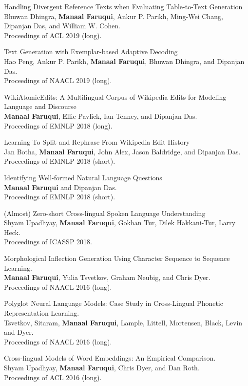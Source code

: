 \documentclass[margin,line]{res}
\begin{document}
\begin{resume}
Handling Divergent Reference Texts when Evaluating Table-to-Text Generation\\
Bhuwan Dhingra, \textbf{Manaal Faruqui}, Ankur P. Parikh, Ming-Wei Chang, Dipanjan Das, and William W. Cohen.\\
Proceedings of ACL 2019 (long).

Text Generation with Exemplar-based Adaptive Decoding\\
Hao Peng, Ankur P. Parikh, \textbf{Manaal Faruqui}, Bhuwan Dhingra, and Dipanjan Das.\\
Proceedings of NAACL 2019 (long).

WikiAtomicEdits: A Multilingual Corpus of Wikipedia Edits for Modeling Language and Discourse\\
\textbf{Manaal Faruqui}, Ellie Pavlick, Ian Tenney, and Dipanjan Das.\\
Proceedings of EMNLP 2018 (long).

Learning To Split and Rephrase From Wikipedia Edit History\\
Jan Botha, \textbf{Manaal Faruqui}, John Alex, Jason Baldridge, and Dipanjan Das.\\
Proceedings of EMNLP 2018 (short).

Identifying Well-formed Natural Language Questions\\
\textbf{Manaal Faruqui} and Dipanjan Das.\\
Proceedings of EMNLP 2018 (short).

(Almost) Zero-short Cross-lingual Spoken Language Understanding\\
Shyam Upadhyay, \textbf{Manaal Faruqui}, Gokhan Tur, Dilek Hakkani-Tur, Larry Heck.\\
Proceedings of ICASSP 2018.

Morphological Inflection Generation Using Character Sequence to Sequence Learning.\\
\textbf{Manaal Faruqui}, Yulia Tsvetkov, Graham Neubig, and Chris Dyer.\\
Proceedings of NAACL 2016 (long).

Polyglot Neural Language Models: Case Study in Cross-Lingual Phonetic Representation Learning.\\
Tsvetkov, Sitaram, \textbf{Manaal Faruqui}, Lample, Littell, Mortensen, Black,  Levin and Dyer.\\
Proceedings of NAACL 2016 (long).

Cross-lingual Models of Word Embeddings: An Empirical Comparison.\\
Shyam Upadhyay, \textbf{Manaal Faruqui}, Chris Dyer, and Dan Roth.\\
Proceedings of ACL 2016 (long).


\end{resume}
\end{document}
